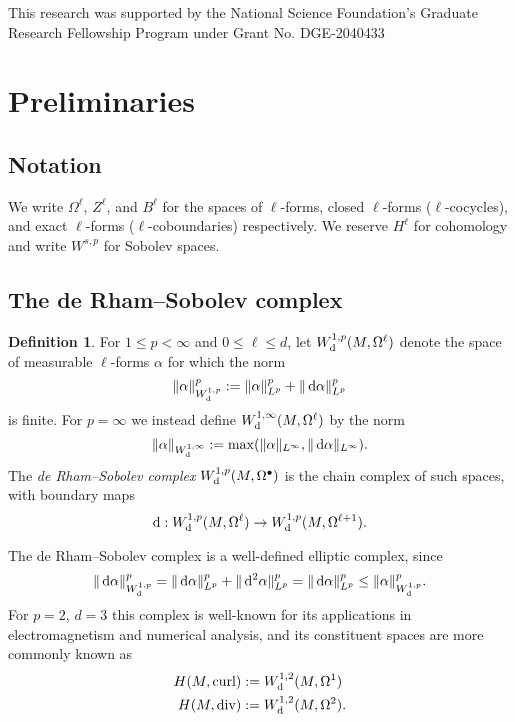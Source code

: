\documentclass[reqno,11pt]{amsart}
\newcommand*\dif{\mathop{}\!\mathrm{d}}
\newcommand{\dfn}[1]{\emph{#1}\index{#1}}
\theoremstyle{definition}
\newtheorem{definition}[theorem]{Definition}
\numberwithin{equation}{section}
\begin{document}
This research was supported by the National Science Foundation's Graduate Research Fellowship Program under Grant No. DGE-2040433

\section{Preliminaries}
\subsection{Notation}
We write $\Omega^\ell$, $Z^\ell$, and $B^\ell$ for the spaces of $\ell$-forms, closed $\ell$-forms ($\ell$-cocycles), and exact $\ell$-forms ($\ell$-coboundaries) respectively.
We reserve $H^\ell$ for cohomology and write $W^{s, p}$ for Sobolev spaces.

\subsection{The de Rham--Sobolev complex}
\begin{definition}
For $1 \leq p < \infty$ and $0 \leq \ell \leq d$, let $W^{1, p}_{\rm d}(M, \Omega^\ell)$ denote the space of measurable $\ell$-forms $\alpha$ for which the norm
$$\|\alpha\|_{W^{1, p}_{\rm d}}^p := \|\alpha\|_{L^p}^p + \|\dif \alpha\|_{L^p}^p$$
is finite.
For $p = \infty$ we instead define $W^{1, \infty}_{\rm d}(M, \Omega^\ell)$ by the norm 
$$\|\alpha\|_{W^{1, \infty}_{\rm d}} := \max(\|\alpha\|_{L^\infty}, \|\dif \alpha\|_{L^\infty}).$$
The \dfn{de Rham--Sobolev complex} $W^{1, p}_{\rm d}(M, \Omega^\bullet)$ is the chain complex of such spaces, with boundary maps 
$$\dif: W^{1, p}_{\rm d}(M, \Omega^\ell) \to W^{1, p}_{\rm d}(M, \Omega^{\ell + 1}).$$
\end{definition}

The de Rham--Sobolev complex is a well-defined elliptic complex, since 
$$\|\dif \alpha\|_{W^{1, p}_{\rm d}}^p = \|\dif \alpha\|_{L^p}^p + \|\dif^2 \alpha\|_{L^p}^p = \|\dif \alpha\|_{L^p}^p \leq \|\alpha\|_{W^{1, p}_{\rm d}}^p.$$
For $p = 2$, $d = 3$ this complex is well-known for its applications in electromagnetism and numerical analysis, and its constituent spaces are more commonly known as \cite[Chapter 2]{cessenat1996mathematical}
\begin{align*}
H(M, \text{curl}) &:= W^{1, 2}_{\rm d}(M, \Omega^1)\\
H(M, \text{div}) &:= W^{1, 2}_{\rm d}(M, \Omega^2).
\end{align*}
\end{document}
